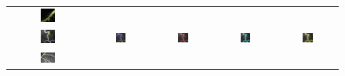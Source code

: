 \begin{figure}[t]
\begin{tabular}{@{}ccccc@{}}
\includegraphics[width=0.19\textwidth]{images/L2S_compare_region/spine2_ours}	
\\
\includegraphics[width=0.19\textwidth]{images/L2S_compare_region/Vessel_CTA1_orig}&
\includegraphics[width=0.19\textwidth]{images/L2S_compare_region/Vessel_CTA1_CV}	&
\includegraphics[width=0.19\textwidth]{images/L2S_compare_region/Vessel_CTA1_Langton} &
\includegraphics[width=0.19\textwidth]{images/L2S_compare_region/Vessel_CTA1_Li}	&
\includegraphics[width=0.19\textwidth]{images/L2S_compare_region/Vessel_CTA1_ours}	
\\
\includegraphics[width=0.19\textwidth]{images/L2S_compare_region/vessel1_orig}	&

\end{tabular}
\end{figure}
